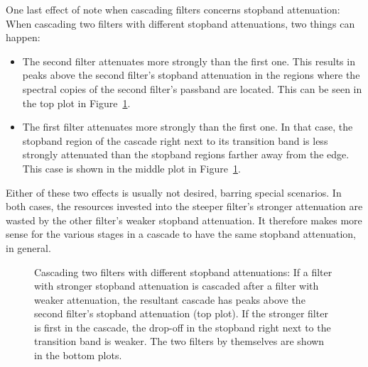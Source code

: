 One last effect of note when cascading filters concerns stopband attenuation:
When cascading two filters with different stopband attenuations, two things
can happen:
\begin{itemize}\tightlist
    \item
        The second  filter attenuates more  strongly than the  first one. This
        results  in  peaks  above  the second  filter's  stopband  attenuation
        in  the regions  where  the  spectral copies  of  the second  filter's
        passband  are   located. This  can  be   seen  in  the  top   plot  in
        Figure~\ref{fig:fdesign:cascade:ast_demo}.
    \item
        The first filter attenuates more  strongly than the first one. In that
        case, the stopband region of the  cascade right next to its transition
        band is  less strongly  attenuated than  the stopband  regions farther
        away  from  the  edge. This  case  is shown  in  the  middle  plot  in
        Figure~\ref{fig:fdesign:cascade:ast_demo}.
\end{itemize}
Either  of  these  two  effects   is  usually  not  desired,  barring  special
scenarios. In both  cases, the  resources invested  into the  steeper filter's
stronger  attenuation  are  wasted  by  the  other  filter's  weaker  stopband
attenuation. It therefore makes more sense for the various stages in a cascade
to have the same stopband attenuation, in general.

\begin{figure}
    \centering
    
    \caption[Cascade: Stopband Attenuation]{%
        Cascading  two  filters  with different  stopband  attenuations: If  a
        filter with stronger  stopband attenuation is cascaded  after a filter
        with weaker  attenuation, the  resultant cascade  has peaks  above the
        second  filter's  stopband  attenuation (top  plot). If  the  stronger
        filter is  first in the  cascade, the  drop-off in the  stopband right
        next to the  transition band is weaker. The two  filters by themselves
        are shown in the bottom plots.%
    }
    \label{fig:fdesign:cascade:ast_demo}
\end{figure}


